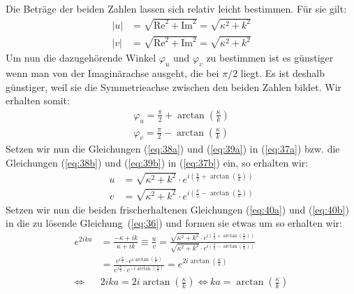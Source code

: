 Die Beträge der beiden Zahlen lassen sich relativ leicht bestimmen. Für sie gilt:
\begin{subequations}
  \begin{align}
    |u|&=\sqrt{\text{Re}^2+\text{Im}^2}=\sqrt{\kappa^2+k^2}\label{eq:38a}\\
    |v|&=\sqrt{\text{Re}^2+\text{Im}^2}=\sqrt{\kappa^2+k^2}\label{eq:38b}   
  \end{align}
\end{subequations}
Um nun die dazugehörende Winkel $\varphi_u$ und $\varphi_v$ zu bestimmen ist es
günstiger wenn man von der Imaginärachse ausgeht, die bei $\pi/2$ liegt. Es ist
deshalb günstiger, weil sie die Symmetrieachse zwischen den beiden Zahlen bildet.
Wir erhalten somit:
\begin{subequations}
  \begin{align}
    \varphi_u=\frac \pi 2 + \arctan \left(\frac \kappa k \right)\label{eq:39a}\\
    \varphi_v=\frac \pi 2 - \arctan \left(\frac \kappa k \right)\label{eq:39b}
  \end{align}
\end{subequations}
Setzen wir nun die Gleichungen (\ref{eq:38a}) und (\ref{eq:39a}) in
(\ref{eq:37a}) bzw. die Gleichungen (\ref{eq:38b}) und (\ref{eq:39b}) in
(\ref{eq:37b}) ein, so erhalten wir:
\begin{subequations}
\begin{align}
  u&=\sqrt{\kappa^2+k^2}\cdot e^
       {i\left(\frac \pi 2 + \arctan \left(\frac \kappa k \right)\right)}
       \label{eq:40a}\\
  v&=\sqrt{\kappa^2+k^2}\cdot e^
       {i\left(\frac \pi 2 - \arctan \left(\frac \kappa k \right)\right)}
       \label{eq:40b}
\end{align}
\end{subequations}
Setzen wir nun die beiden frischerhaltenen Gleichungen (\ref{eq:40a}) und
(\ref{eq:40b}) in die zu lösende Gleichung~(\ref{eq:36}) und formen sie etwas um
so erhalten wir:
\begin{align*}
  e^{2ika} &=\frac{-\kappa+ik}{\kappa+ik} \equiv \frac u v
  =\frac
  {\sqrt{\kappa^2+k^2}\cdot e^
       {i\left(\frac \pi 2 + \arctan \left(\frac \kappa k \right)\right)}}
  {\sqrt{\kappa^2+k^2}\cdot e^
       {i\left(\frac \pi 2 - \arctan \left(\frac \kappa k \right)\right)}}\\
  &=\frac
  {e^{i\frac \pi 2}\cdot e^{i \arctan \left(\frac \kappa k \right)}}
  {e^{i\frac \pi 2}\cdot e^{-i \arctan \left(\frac \kappa k \right)}}
   =e^{2 i \arctan \left(\frac \kappa k \right)}\\
    \Leftrightarrow &
   2 i ka= 2 i \arctan \left(\frac \kappa k \right)
    \Leftrightarrow
   ka=\arctan \left(\frac \kappa k \right)
\end{align*}
